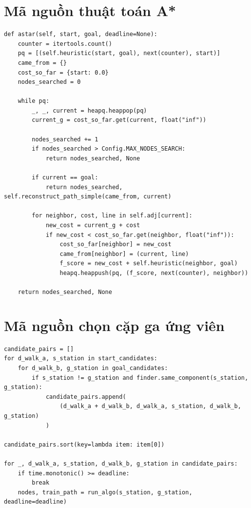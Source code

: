 \documentclass[12pt,a4paper]{article}
\begin{document}
\section{Mã nguồn thuật toán A*}

\begin{lstlisting}[style=pythonstyle, caption={Cài đặt thuật toán A*}]
def astar(self, start, goal, deadline=None):
    counter = itertools.count()
    pq = [(self.heuristic(start, goal), next(counter), start)]
    came_from = {}
    cost_so_far = {start: 0.0}
    nodes_searched = 0

    while pq:
        _, _, current = heapq.heappop(pq)
        current_g = cost_so_far.get(current, float("inf"))

        nodes_searched += 1
        if nodes_searched > Config.MAX_NODES_SEARCH:
            return nodes_searched, None

        if current == goal:
            return nodes_searched, self.reconstruct_path_simple(came_from, current)

        for neighbor, cost, line in self.adj[current]:
            new_cost = current_g + cost
            if new_cost < cost_so_far.get(neighbor, float("inf")):
                cost_so_far[neighbor] = new_cost
                came_from[neighbor] = (current, line)
                f_score = new_cost + self.heuristic(neighbor, goal)
                heapq.heappush(pq, (f_score, next(counter), neighbor))

    return nodes_searched, None
\end{lstlisting}

\section{Mã nguồn chọn cặp ga ứng viên}

\begin{lstlisting}[style=pythonstyle, caption={Ưu tiên cặp ga có tổng khoảng cách đi bộ ngắn}]
candidate_pairs = []
for d_walk_a, s_station in start_candidates:
    for d_walk_b, g_station in goal_candidates:
        if s_station != g_station and finder.same_component(s_station, g_station):
            candidate_pairs.append(
                (d_walk_a + d_walk_b, d_walk_a, s_station, d_walk_b, g_station)
            )

candidate_pairs.sort(key=lambda item: item[0])

for _, d_walk_a, s_station, d_walk_b, g_station in candidate_pairs:
    if time.monotonic() >= deadline:
        break
    nodes, train_path = run_algo(s_station, g_station, deadline=deadline)
\end{lstlisting}
\end{document}
